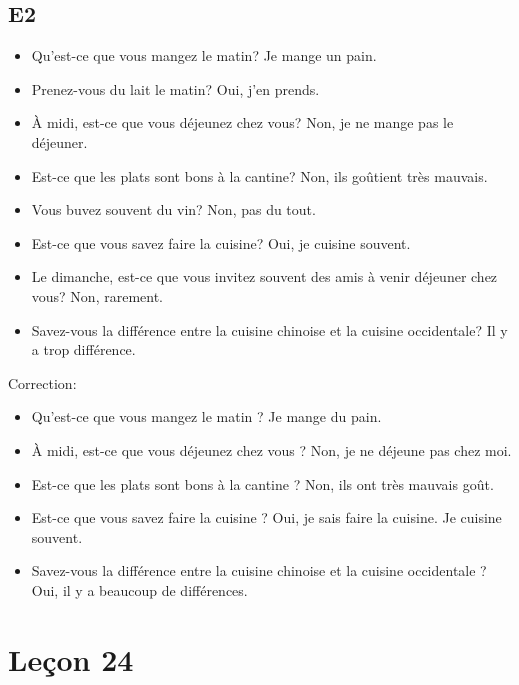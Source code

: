\documentclass{book}
\begin{document}
    \section{E2}
        \begin{itemize}
            \item Qu'est-ce que vous mangez le matin? Je mange un pain.
            \item Prenez-vous du lait le matin? Oui, j'en prends.
            \item À midi, est-ce que vous déjeunez chez vous? Non, je ne mange pas le déjeuner.
            \item Est-ce que les plats sont bons à la cantine? Non, ils goûtient très mauvais.
            \item Vous buvez souvent du vin? Non, pas du tout.
            \item Est-ce que vous savez faire la cuisine? Oui, je cuisine souvent.
            \item Le dimanche, est-ce que vous invitez souvent des amis à venir déjeuner chez vous? Non, rarement.
            \item Savez-vous la différence entre la cuisine chinoise et la cuisine occidentale? Il y a trop différence.
        \end{itemize}
        Correction:
        \begin{itemize}
            \item Qu'est-ce que vous mangez le matin ? Je mange du pain.
            \item À midi, est-ce que vous déjeunez chez vous ? Non, je ne déjeune pas chez moi.
            \item Est-ce que les plats sont bons à la cantine ? Non, ils ont très mauvais goût.
            \item Est-ce que vous savez faire la cuisine ? Oui, je sais faire la cuisine. Je cuisine souvent.
            \item Savez-vous la différence entre la cuisine chinoise et la cuisine occidentale ? Oui, il y a beaucoup de différences.
        \end{itemize}

\chapter{Leçon 24}
\end{document}
